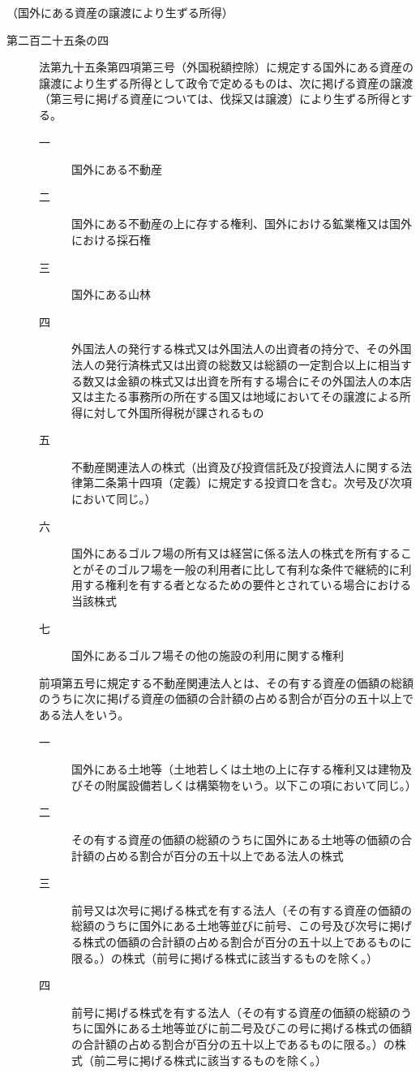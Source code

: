 \documentclass[twocolumn,a4j,10pt]{ltjtarticle}
\begin{document}
\noindent\hspace{10pt}（国外にある資産の譲渡により生ずる所得）
\begin{description}
\item[第二百二十五条の四]法第九十五条第四項第三号（外国税額控除）に規定する国外にある資産の譲渡により生ずる所得として政令で定めるものは、次に掲げる資産の譲渡（第三号に掲げる資産については、伐採又は譲渡）により生ずる所得とする。
\begin{description}
\item[一]国外にある不動産
\item[二]国外にある不動産の上に存する権利、国外における鉱業権又は国外における採石権
\item[三]国外にある山林
\item[四]外国法人の発行する株式又は外国法人の出資者の持分で、その外国法人の発行済株式又は出資の総数又は総額の一定割合以上に相当する数又は金額の株式又は出資を所有する場合にその外国法人の本店又は主たる事務所の所在する国又は地域においてその譲渡による所得に対して外国所得税が課されるもの
\item[五]不動産関連法人の株式（出資及び投資信託及び投資法人に関する法律第二条第十四項（定義）に規定する投資口を含む。次号及び次項において同じ。）
\item[六]国外にあるゴルフ場の所有又は経営に係る法人の株式を所有することがそのゴルフ場を一般の利用者に比して有利な条件で継続的に利用する権利を有する者となるための要件とされている場合における当該株式
\item[七]国外にあるゴルフ場その他の施設の利用に関する権利
\end{description}
\item[]前項第五号に規定する不動産関連法人とは、その有する資産の価額の総額のうちに次に掲げる資産の価額の合計額の占める割合が百分の五十以上である法人をいう。
\begin{description}
\item[一]国外にある土地等（土地若しくは土地の上に存する権利又は建物及びその附属設備若しくは構築物をいう。以下この項において同じ。）
\item[二]その有する資産の価額の総額のうちに国外にある土地等の価額の合計額の占める割合が百分の五十以上である法人の株式
\item[三]前号又は次号に掲げる株式を有する法人（その有する資産の価額の総額のうちに国外にある土地等並びに前号、この号及び次号に掲げる株式の価額の合計額の占める割合が百分の五十以上であるものに限る。）の株式（前号に掲げる株式に該当するものを除く。）
\item[四]前号に掲げる株式を有する法人（その有する資産の価額の総額のうちに国外にある土地等並びに前二号及びこの号に掲げる株式の価額の合計額の占める割合が百分の五十以上であるものに限る。）の株式（前二号に掲げる株式に該当するものを除く。）
\end{description}
\end{description}
\end{document}
